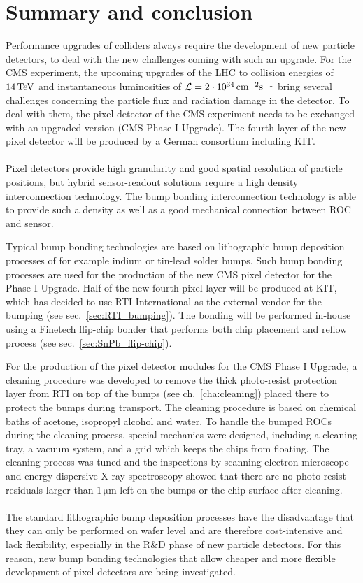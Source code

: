 \acresetall
\chapter{Summary and conclusion}\label{cha:summary}
Performance upgrades of colliders always require the development of new particle detectors, to deal with the new challenges coming with such an upgrade. For the \ac{CMS} experiment, the upcoming upgrades of the \ac{LHC} to collision energies of $14\,\rm{TeV}$ and instantaneous luminosities of $\mathcal{L}=2\cdot10^{34}\,\rm{cm^{-2}s^{-1}}$ bring several challenges concerning the particle flux and radiation damage in the detector. To deal with them, the pixel detector of the \ac{CMS} experiment needs to be exchanged with an upgraded version (\ac{CMS} Phase I Upgrade). The fourth layer of the new pixel detector will be produced by a German consortium including \ac{KIT}.\\
\\
Pixel detectors provide high granularity and good spatial resolution of particle positions, but hybrid sensor-readout solutions require a high density interconnection technology. The bump bonding interconnection technology is able to provide such a density as well as a good mechanical connection between \ac{ROC} and sensor.

Typical bump bonding technologies are based on lithographic bump deposition processes of for example indium or tin-lead solder bumps. Such bump bonding processes are used for the production of the new \ac{CMS} pixel detector for the Phase I Upgrade. Half of the new fourth pixel layer will be produced at \ac{KIT}, which has decided to use RTI International as the external vendor for the bumping (see sec.~\ref{sec:RTI_bumping}). The bonding will be performed in-house using a Finetech flip-chip bonder that performs both chip placement and reflow process (see sec.~\ref{sec:SnPb_flip-chip}).

For the production of the pixel detector modules for the \ac{CMS} Phase I Upgrade, a cleaning procedure was developed to remove the thick photo-resist protection layer from RTI on top of the bumps (see ch.~\ref{cha:cleaning}) placed there to protect the bumps during transport. The cleaning procedure is based on chemical baths of acetone, isopropyl alcohol and water. To handle the bumped \ac{ROC}s during the cleaning process, special mechanics were designed, including a cleaning tray, a vacuum system, and a grid which keeps the chips from floating. The cleaning process was tuned and the inspections by scanning electron microscope and energy dispersive X-ray spectroscopy showed that there are no photo-resist residuals larger than $1\,\si{\micro \meter}$ left on the bumps or the chip surface after cleaning.
\\
\\
The standard lithographic bump deposition processes have the disadvantage that they can only be performed on wafer level and are therefore cost-intensive and lack flexibility, especially in the R$\&$D phase of new particle detectors. For this reason, new bump bonding technologies that allow cheaper and more flexible development of pixel detectors are being investigated. 

